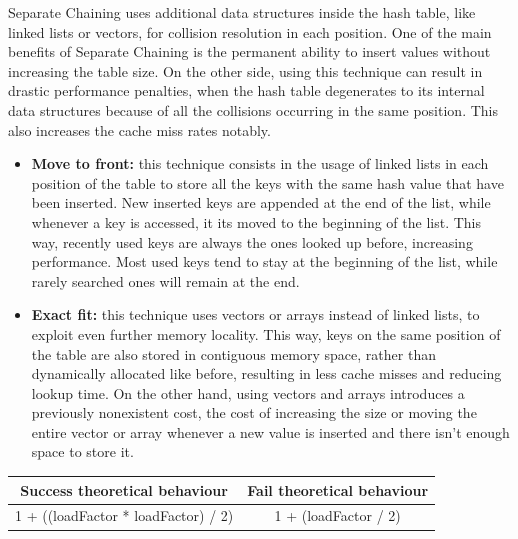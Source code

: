\documentclass{article}
\begin{document}
    Separate Chaining uses additional data structures inside the hash table, like linked lists or vectors, for collision resolution in each position. One of the main benefits of Separate Chaining is the permanent ability to insert values without increasing the table size. On the other side, using this technique can result in drastic performance penalties, when the hash table degenerates to its internal data structures because of all the collisions occurring in the same position. This also increases the cache miss rates notably.
\begin{itemize}
    \item \textbf{Move to front:} this technique consists in the usage of linked lists in each position of the table to store all the keys with the same hash value that have been inserted. New inserted keys are appended at the end of the list, while whenever a key is accessed, it its moved to the beginning of the list. This way, recently used keys are always the ones looked up before, increasing performance. Most used keys tend to stay at the beginning of the list, while rarely searched ones will remain at the end.

    \item \textbf{Exact fit:} this technique uses vectors or arrays instead of linked lists, to exploit even further memory locality. This way, keys on the same position of the table are also stored in contiguous memory space, rather than dynamically allocated like before, resulting in less cache misses and reducing lookup time. On the other hand, using vectors and arrays introduces a previously nonexistent cost, the cost of increasing the size or moving the entire vector or array whenever a new value is inserted and there isn't enough space to store it.
\end{itemize}

\begin{tabular}{c|c}
Success theoretical behaviour & Fail theoretical behaviour \\
\hline
1 + ((loadFactor * loadFactor) / 2) & 1 + (loadFactor / 2) \\
 
\end{tabular}
    
\end{document}

